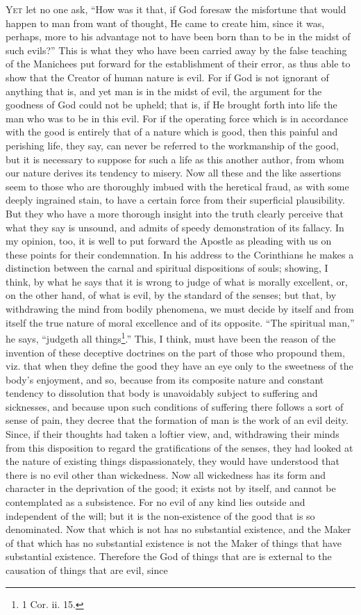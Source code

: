 \textsc{Yet} let no one ask, “How was it that, if God foresaw the misfortune that would happen to man from want of thought, He came to create him, since it was, perhaps, more to his advantage not to have been born than to be in the midst of such evils?” This is what they who have been carried away by the false teaching of the Manichees put forward for the establishment of their error, as thus able to show that the Creator of human nature is evil. For if God is not ignorant of anything that is, and yet man is in the midst of evil, the argument for the goodness of God could not be upheld; that is, if He brought forth into life the man who was to be in this evil. For if the operating force which is in accordance with the good is entirely that of a nature which is good, then this painful and perishing life, they say, can never be referred to the workmanship of the good, but it is necessary to suppose for such a life as this another author, from whom our nature derives its tendency to misery. Now all these and the like assertions seem to those who are thoroughly imbued with the heretical fraud, as with some deeply ingrained stain, to have a certain force from their superficial plausibility. But they who have a more thorough insight into the truth clearly perceive that what they say is unsound, and admits of speedy demonstration of its fallacy. In my opinion, too, it is well to put forward the Apostle as pleading with us on these points for their condemnation. In his address to the Corinthians he makes a distinction between the carnal and spiritual dispositions of souls; showing, I think, by what he says that it is wrong to judge of what is morally excellent, or, on the other hand, of what is evil, by the standard of the senses; but that, by withdrawing the mind from bodily phenomena, we must decide by itself and from itself the true nature of moral excellence and of its opposite. “The spiritual man,” he says, “judgeth all things\footnote{1 Cor. ii. 15.}.” This, I think, must have been the reason of the invention of these deceptive doctrines on the part of those who propound them, viz. that when they define the good they have an eye only to the sweetness of the body’s enjoyment, and so, because from its composite nature and constant tendency to dissolution that body is unavoidably subject to suffering and sicknesses, and because upon such conditions of suffering there follows a sort of sense of pain, they decree that the formation of man is the work of an evil deity. Since, if their thoughts had taken a loftier view, and, withdrawing their minds from this disposition to regard the gratifications of the senses, they had looked at the nature of existing things dispassionately, they would have understood that there is no evil other than wickedness. Now all wickedness has its form and character in the deprivation of the good; it exists not by itself, and cannot be contemplated as a subsistence. For no evil of any kind lies outside and independent of the will; but it is the non-existence of the good that is so denominated. Now that which is not has no substantial existence, and the Maker of that which has no substantial existence is not the Maker of things that have substantial existence. Therefore the God of things that are is external to the causation of things that are evil, since 